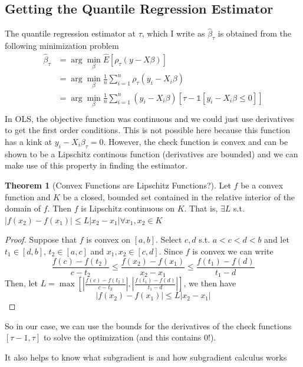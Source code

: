 \documentclass[12pt]{article}
\theoremstyle{definition}
\theoremstyle{property}
\theoremstyle{assumption}
\theoremstyle{example}
\theoremstyle{comment}
\newtheorem{theorem}{Theorem}[section]
\begin{document}
\subsection{Getting the Quantile Regression Estimator}
The quantile regression estimator at $\tau$, which I write as $\hat{\beta}_\tau$ is obtained from the following minimization problem
\[
\begin{aligned}
\hat{\beta}_ \tau &=  \arg\min_{\beta} \widehat{E}[\rho_\tau(y-X\beta)]\\
&=\arg\min_{\beta} \frac{1}{n}\sum_{i=1}^n \rho_\tau (y_i-X_i\beta)\\
&=\arg\min_{\beta} \frac{1}{n}\sum_{i=1}^n (y_i-X_i\beta)[\tau-\mathbb{1}[y_i-X_i\beta\leq0]]\\
\end{aligned}
\]
In OLS, the objective function was continuous and we could just use derivatives to get the first order conditions. This is not possible here because this function has a kink at $y_i-X_i\beta_\tau=0$. However, the check function is convex and can be shown to be a Lipschitz continous function (derivatives are bounded) and we can make use of this property in finding the estimator. 
\begin{mdframed}[backgroundcolor=green!5] 
\begin{theorem}[Convex Functions are Lipschitz Functions?] Let $f$ be a convex function and $K$ be a closed, bounded set contained in the relative interior of the domain of $f$. Then $f$ is Lipschitz continuous on $K$. That is, $\exists L$ s.t. $|f(x_2)-f(x_1)|\leq L|x_2-x_1| \forall x_1, x_2\in K$
\begin{proof}
Suppose that $f$ is convex on $[a,b]$. Select $c,d$ s.t. $a<c<d<b$ and let $t_1\in[d,b]$, $t_2\in[a,c]$ and $x_1,x_2\in[c,d]$. Since $f$ is convex we can write
\[
\frac{f(c)-f(t_2)}{c-t_2}\leq \frac{f(x_2)-f(x_1)}{x_2-x_1}\leq \frac{f(t_1)-f(d)}{t_1-d}
\]
Then, let $L=\max\left[\left|\frac{f(c)-f(t_2)}{c-t_2}\right|,\left|\frac{f(t_1)-f(d)}{t_1-d}\right|\right]$, we then have 
\[|f(x_2)-f(x_1)|\leq L|x_2-x_1|\]
\end{proof}
\end{theorem}
\end{mdframed}
So in our case, we can use the bounds for the derivatives of the check functions $[\tau-1,\tau]$ to solve the optimization (and this contains 0!). \par
It also helps to know what subgradient is and how subgradient calculus works
\end{document}
